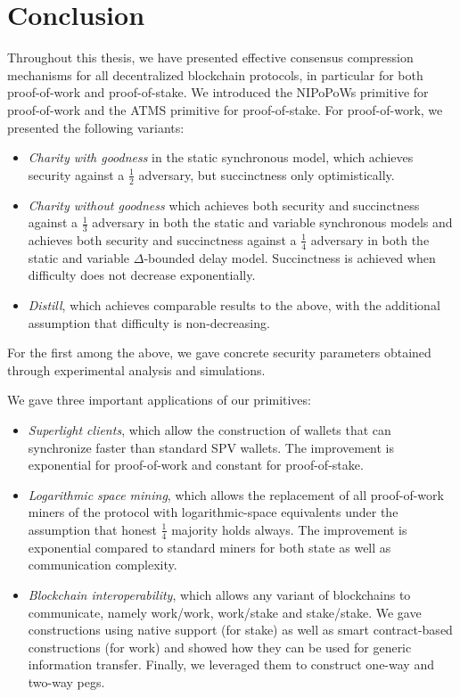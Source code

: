 \chapter{Conclusion}\label{chapter:conclusion}

Throughout this thesis, we have presented effective consensus compression
mechanisms for all decentralized blockchain protocols, in particular for
both proof-of-work and proof-of-stake. We introduced the NIPoPoWs primitive for
proof-of-work and the ATMS primitive for proof-of-stake. For proof-of-work, we
presented the following variants:

\begin{itemize}
  \item \emph{Charity with goodness} in the static synchronous model, which
        achieves security against a $\frac{1}{2}$ adversary, but succinctness
        only optimistically.
  \item \emph{Charity without goodness} which achieves both security and
        succinctness against a $\frac{1}{3}$ adversary in both the static and
        variable synchronous models and achieves both security and succinctness
        against a $\frac{1}{4}$ adversary in both the static and variable
        $\Delta$-bounded delay model. Succinctness is achieved when difficulty
        does not decrease exponentially.
  \item \emph{Distill}, which achieves comparable results to the above, with the
        additional assumption that difficulty is non-decreasing.
\end{itemize}

For the first among the above, we gave concrete security parameters obtained
through experimental analysis and simulations.

We gave three important applications of our primitives:

\begin{itemize}
  \item \emph{Superlight clients}, which allow the construction of wallets that
        can synchronize faster than standard SPV wallets. The improvement is
        exponential for proof-of-work and constant for proof-of-stake.
  \item \emph{Logarithmic space mining}, which allows the replacement of all
        proof-of-work miners of the protocol with logarithmic-space equivalents
        under the assumption that honest $\frac{1}{4}$ majority holds always.
        The improvement is exponential compared to standard miners for both
        state as well as communication complexity.
  \item \emph{Blockchain interoperability}, which allows any variant of
        blockchains to communicate, namely work/work, work/stake and
        stake/stake. We gave constructions using native support (for stake) as
        well as smart contract-based constructions (for work) and showed how
        they can be used for generic information transfer. Finally, we leveraged
        them to construct one-way and two-way pegs.
\end{itemize}

